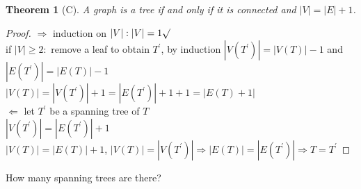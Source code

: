 \documentclass{article}
\newtheorem*{theorem}{Theorem}
\theoremstyle{definition}
\theoremstyle{remark}
\begin{document}
\begin{theorem}[C]
    A graph is a tree if and only if it is connected and $|V| = |E| + 1$.
\end{theorem}
\begin{proof}
    $\Rightarrow$ induction on $|V|: |V| = 1 \surd $\\
    if $|V| \geq  2:$ remove a leaf to obtain $T^\prime$, by induction $|V(T^\prime )|= |V(T)| - 1$ and $|E(T^\prime)| = |E(T)| - 1$\\
    $|V(T)| = |V(T^\prime)| + 1 = |E(T^\prime)| + 1 + 1 = |E(T) + 1|$\\
    $\Leftarrow$ let $T^\prime$ be a spanning tree of $T$\\
    $|V(T^\prime)|=|E(T^\prime)| + 1$\\
    $|V(T)|=|E(T)| + 1$, $|V(T)|=|V(T^\prime)| \Rightarrow |E(T)|=|E(T^\prime)|\Rightarrow T=T^\prime$
\end{proof}
\pagebreak
How many spanning trees are there?
\end{document}
